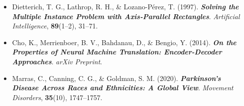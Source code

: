 \documentclass[listof=nochaptergap,12pt,times,authoryear]{report}
\begin{document}
\begin{itemize}
    \item Dietterich, T. G., Lathrop, R. H., \& Lozano-Pérez, T. (1997). \textbf{\textit{Solving the Multiple Instance Problem with Axis-Parallel Rectangles}}. \textit{Artificial Intelligence}, \textbf{89}(1--2), 31--71.

    \item Cho, K., Merrienboer, B. V., Bahdanau, D., \& Bengio, Y. (2014). \textbf{\textit{On the Properties of Neural Machine Translation: Encoder-Decoder Approaches}}. \textit{arXiv Preprint}.

    \item Marras, C., Canning, C. G., \& Goldman, S. M. (2020). \textbf{\textit{Parkinson’s Disease Across Races and Ethnicities: A Global View}}. \textit{Movement Disorders}, \textbf{35}(10), 1747--1757.
\end{itemize}
    
\end{document}
